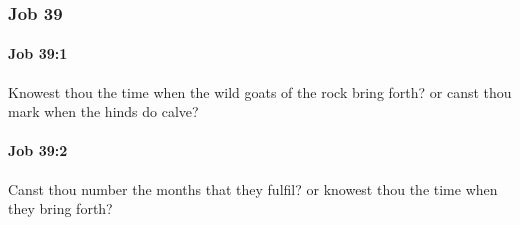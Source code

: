 	\subsubsection{Job 39} %
		\label{JOB-39}

		\paragraph{Job 39:1} %
			\label{JOB-39-1}

			Knowest thou the time when the wild goats of the rock bring forth? or canst thou mark when the hinds do calve?


		\paragraph{Job 39:2} %
			\label{JOB-39-2}

			Canst thou number the months that they fulfil? or knowest thou the time when they bring forth?

